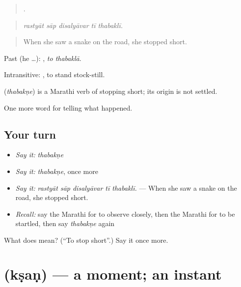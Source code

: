 \begin{quote}
    .
\end{quote}

\begin{quote}
\emph{rastyāt sāp disalyāvar tī thabaklī.}
\end{quote}

\begin{quote}
When she saw a snake on the road, she stopped short.
\end{quote}

Past (he …):  , \emph{to thabaklā}.

Intransitive:   , to stand stock-still.

\begin{cousinweb}
\textbf{} (\emph{thabakṇe}) is a Marathi verb of stopping short; its origin is not settled.
\end{cousinweb}

\begin{grammarlens}[title={What you've built}]
One more word for telling what happened.
\end{grammarlens}

\subsection*{Your turn}
\begin{itemize}
\raggedright
  \item \emph{Say it:} \emph{thabakṇe}
  \item \emph{Say it:} \emph{thabakṇe}, once more
  \item \emph{Say it:} \emph{rastyāt sāp disalyāvar tī thabaklī.} — When she saw a snake on the road, she stopped short.
  \item \emph{Recall:} say the Marathi for to observe closely, then the Marathi for to be startled, then say \emph{thabakṇe} again
\end{itemize}

\begin{tcolorbox}[breakable,colback=teal!4,colframe=teal!35!black,title={Before you move on}]
What does  mean? (\textquotedblleft{}To stop short\textquotedblright{}.) Say it once more.
\end{tcolorbox}
\section[\texorpdfstring{\mr{क्षण} (kṣaṇ)}{क्षण (kṣaṇ)}]{ (kṣaṇ) — a moment; an instant}

